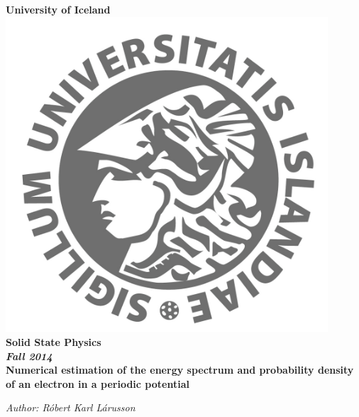 \documentclass[11pt,a4paper]{article}
\author{Róbert Karl Lárusson}
\begin{document}
\thispagestyle{empty}

\begin{doublespacing}
\begin{center} \huge\bf
University of Iceland \\	
\includegraphics[width=12cm]{HI-logo.jpg}\\
Solid State Physics \\
\emph{Fall  2014} \\ 
\vspace{1cm}
Numerical estimation of the energy spectrum and probability density of an electron in a periodic potential \\
\end{center}
\vspace{1cm}
\textit{Author: Róbert Karl Lárusson}
\end{doublespacing}
\newpage
\end{document}
